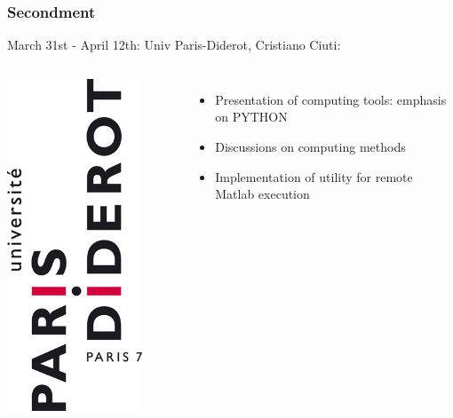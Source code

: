 \documentclass[14pt]{beamer}
\begin{document}
\begin{frame}
\frametitle{Secondment}
March 31st - April 12th: Univ Paris-Diderot, Cristiano Ciuti:
\begin{columns}
\centering
\includegraphics[width=0.8\textwidth]{UPD}

\begin{itemize}
\item Presentation of computing tools: emphasis on PYTHON
\item Discussions on computing methods
\item Implementation of utility for remote Matlab execution
\end{itemize}
\end{columns}
\end{frame}
\end{document}
